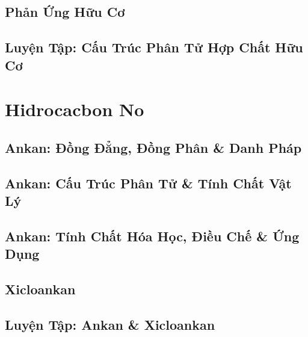 \documentclass[oneside]{book}
\numberwithin{equation}{section}
\begin{document}

\section{Phản Ứng Hữu Cơ}


\section{Luyện Tập: Cấu Trúc Phân Tử Hợp Chất Hữu Cơ}


\chapter{Hidrocacbon No}

\section{Ankan: Đồng Đẳng, Đồng Phân \& Danh Pháp}


\section{Ankan: Cấu Trúc Phân Tử \& Tính Chất Vật Lý}


\section{Ankan: Tính Chất Hóa Học, Điều Chế \& Ứng Dụng}


\section{Xicloankan}


\section{Luyện Tập: Ankan \& Xicloankan}
\end{document}
